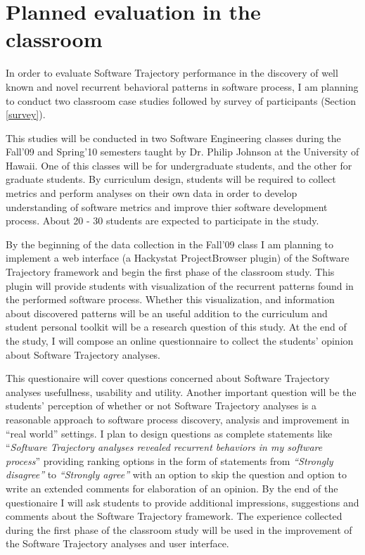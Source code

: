 \section{Planned evaluation in the classroom}\label{classroom}
In order to evaluate Software Trajectory performance in the discovery of well known and novel recurrent behavioral patterns in software process, I am planning to conduct two classroom case studies followed by survey of participants (Section \ref{survey}). 

This studies will be conducted in two Software Engineering classes during the Fall'09 and Spring'10 semesters taught by Dr. Philip Johnson at the University of Hawaii. One of this classes will be for undergraduate students, and the other for graduate students. By curriculum design, students will be required to collect metrics and perform analyses on their own data in order to develop understanding of software metrics and improve thier software development process. About 20 - 30 students are expected to participate in the study. 

By the beginning of the data collection in the Fall'09 class I am planning to implement a web interface (a Hackystat ProjectBrowser plugin) of the Software Trajectory framework and begin the first phase of the classroom study. This plugin will provide students with visualization of the recurrent patterns found in  the performed software process. Whether this visualization, and information about discovered patterns will be an useful addition to the curriculum and student personal toolkit will be a research question of this study. At the end of the study, I will compose an online questionnaire to collect the students' opinion about Software Trajectory analyses. 

This questionaire will cover questions concerned about Software Trajectory analyses usefullness, usability and utility. Another important question will be the students' perception of whether or not Software Trajectory analyses is a reasonable approach to software process discovery, analysis and improvement in ``real world'' settings. I plan to design questions as complete statements like ``\textit{Software Trajectory analyses revealed recurrent behaviors in my software process}'' providing ranking options in the form of statements from \textit{``Strongly disagree''} to \textit{``Strongly agree''} with an option to skip the question and option to write an extended comments for elaboration of an opinion. By the end of the questionaire I will ask students to provide additional impressions, suggestions and comments about the Software Trajectory framework. The experience collected during the first phase of the classroom study will be used in the improvement of the Software Trajectory analyses and user interface.

